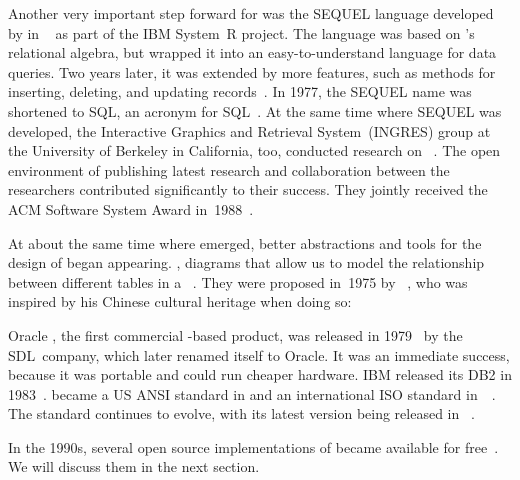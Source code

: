 Another very important step forward for  was the SEQUEL language developed by \citeauthor{CB1974SASEQL} in \citeyear{CB1974SASEQL}~\cite{CB1974SASEQL} as part of the IBM System~R project.
The language was based on \citeauthor{C1970ARMODFLSDB}'s relational algebra, but wrapped it into an easy-to-understand language for data queries.
Two years later, it was extended by more features, such as methods for inserting, deleting, and updating records~\cite{CAEGLMRB1976S2AUATDDMAC}.
In 1977, the SEQUEL name was shortened to \acrshort{SQL}, an acronym for \acrfull{SQL}~\cite{C20245YOQ}.
At the same time where SEQUEL was developed, the Interactive Graphics and Retrieval System~(INGRES) group at the University of Berkeley in California, too, conducted research on ~\cite{S1986TIPAOARDS}.
The open environment of publishing latest research and collaboration between the researchers contributed significantly to their success.
They jointly received the ACM Software System Award in~1988~\cite{C20245YOQ}.

At about the same time where  emerged, better abstractions and tools for the design of  began appearing.
, diagrams that allow us to model the relationship between different tables in a \db~\cite{KW2012ASHOTEDAIM,C1976TERMTAUVOD}.
They were proposed in~1975 by \citeauthor{C1975TRMTAUVOD}~\cite{C1975TRMTAUVOD}, who was inspired by his Chinese cultural heritage when doing so:%
%

Oracle , the first commercial -based product, was released in 1979~\cite{C20245YOQ} by the SDL~company, which later renamed itself to Oracle.
It was an immediate success, because it was portable and could run cheaper hardware.
IBM released its   DB2 in 1983~\cite{C20245YOQ,HS2013THAGOID}.
 became a US ANSI standard in \citeyear{ANSIX3135} and an international ISO standard in~\citeyear{ISO90751987}~\cite{ANSIX3135,ISO90751987}.
The standard continues to evolve, with its latest version being released in \citeyear{ISOIEC9707112023E}~\cite{ISOIEC9707112023E}.

In the 1990s, several open source implementations of  became available for free~\cite{C20245YOQ}.
We will discuss them in the next section.%
%
\endhsection%
%
